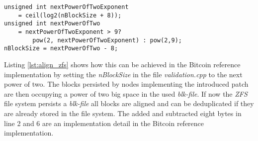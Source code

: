 \begin{minipage}{\linewidth}
\begin{lstlisting}[caption=Aligning the block size in the Bitcoin reference implementation for \textit{ZFS}, label={lst:align_zfs}, basicstyle=\ttfamily, captionpos=b]
unsigned int nextPowerOfTwoExponent
	= ceil(log2(nBlockSize + 8));
unsigned int nextPowerOfTwo
	= nextPowerOfTwoExponent > 9?
		pow(2, nextPowerOfTwoExponent) : pow(2,9);
nBlockSize = nextPowerOfTwo - 8;
\end{lstlisting}
\end{minipage}

Listing \ref{lst:align_zfs} shows how this can be achieved in the Bitcoin reference implementation by setting the \textit{nBlockSize} in the file \textit{validation.cpp} to the next power of two.
The blocks persisted by nodes implementing the introduced patch are then occupying a power of two big space in the used \textit{blk-file}.
If now the \textit{ZFS} file system persists a \textit{blk-file} all blocks are aligned and can be deduplicated if they are already stored in the file system.
The added and subtracted eight bytes in line 2 and 6 are an implementation detail in the Bitcoin reference implementation.

